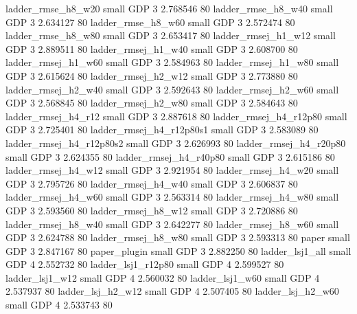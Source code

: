       ladder_rmse_h8_w20      small      GDP                 3 2.768546 80
      ladder_rmse_h8_w40      small      GDP                 3 2.634127 80
      ladder_rmse_h8_w60      small      GDP                 3 2.572474 80
      ladder_rmse_h8_w80      small      GDP                 3 2.653417 80
     ladder_rmsej_h1_w12      small      GDP                 3 2.889511 80
     ladder_rmsej_h1_w40      small      GDP                 3 2.608700 80
     ladder_rmsej_h1_w60      small      GDP                 3 2.584963 80
     ladder_rmsej_h1_w80      small      GDP                 3 2.615624 80
     ladder_rmsej_h2_w12      small      GDP                 3 2.773880 80
     ladder_rmsej_h2_w40      small      GDP                 3 2.592643 80
     ladder_rmsej_h2_w60      small      GDP                 3 2.568845 80
     ladder_rmsej_h2_w80      small      GDP                 3 2.584643 80
     ladder_rmsej_h4_r12      small      GDP                 3 2.887618 80
  ladder_rmsej_h4_r12p80      small      GDP                 3 2.725401 80
ladder_rmsej_h4_r12p80s1      small      GDP                 3 2.583089 80
ladder_rmsej_h4_r12p80s2      small      GDP                 3 2.626993 80
  ladder_rmsej_h4_r20p80      small      GDP                 3 2.624355 80
  ladder_rmsej_h4_r40p80      small      GDP                 3 2.615186 80
     ladder_rmsej_h4_w12      small      GDP                 3 2.921954 80
     ladder_rmsej_h4_w20      small      GDP                 3 2.795726 80
     ladder_rmsej_h4_w40      small      GDP                 3 2.606837 80
     ladder_rmsej_h4_w60      small      GDP                 3 2.563314 80
     ladder_rmsej_h4_w80      small      GDP                 3 2.593560 80
     ladder_rmsej_h8_w12      small      GDP                 3 2.720886 80
     ladder_rmsej_h8_w40      small      GDP                 3 2.642277 80
     ladder_rmsej_h8_w60      small      GDP                 3 2.624788 80
     ladder_rmsej_h8_w80      small      GDP                 3 2.593313 80
                   paper      small      GDP                 3 2.847167 80
            paper_plugin      small      GDP                 3 2.882250 80
         ladder_lsj1_all      small      GDP                 4 2.552732 80
      ladder_lsj1_r12p80      small      GDP                 4 2.599527 80
         ladder_lsj1_w12      small      GDP                 4 2.560032 80
         ladder_lsj1_w60      small      GDP                 4 2.537937 80
       ladder_lsj_h2_w12      small      GDP                 4 2.507405 80
       ladder_lsj_h2_w60      small      GDP                 4 2.533743 80
